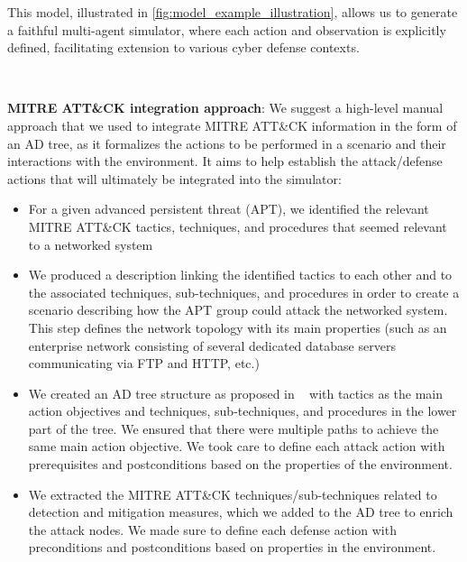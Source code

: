 This model, illustrated in \autoref{fig:model_example_illustration}, allows us to generate a faithful multi-agent simulator, where each action and observation is explicitly defined, facilitating extension to various cyber defense contexts.

\

\noindent
\textbf{MITRE ATT\&CK integration approach}: We suggest a high-level manual approach that we used to integrate MITRE ATT\&CK information in the form of an AD tree, as it formalizes the actions to be performed in a scenario and their interactions with the environment. It aims to help establish the attack/defense actions that will ultimately be integrated into the simulator:
%
\begin{itemize}
  \item For a given advanced persistent threat (APT), we identified the relevant MITRE ATT\&CK tactics, techniques, and procedures that seemed relevant to a networked system

  \item We produced a description linking the identified tactics to each other and to the associated techniques, sub-techniques, and procedures in order to create a scenario describing how the APT group could attack the networked system. This step defines the network topology with its main properties
        (such as an enterprise network consisting of several dedicated database servers communicating via FTP and HTTP, etc.)

  \item We created an AD tree structure as proposed in ~\cite {BKordy2010} with tactics as the main action objectives and techniques, sub-techniques, and procedures in the lower part of the tree. We ensured that there were multiple paths to achieve the same main action objective. We took care to define each attack action with prerequisites and postconditions based on the properties of the environment.

  \item We extracted the MITRE ATT\&CK techniques/sub-techniques related to detection and mitigation measures, which we added to the AD tree to enrich the attack nodes. We made sure to define each defense action with preconditions and postconditions based on properties in the environment.


\end{itemize}

